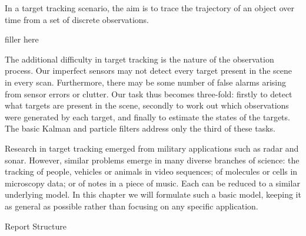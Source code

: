 In a target tracking scenario, the aim is to trace the trajectory of an object over time from a set of discrete observations.

filler here

The additional difficulty in target tracking is the nature of the observation process. Our imperfect sensors may not detect every target present in the scene in every scan. Furthermore, there may be some number of false alarms arising from sensor errors or clutter. Our task thus becomes three-fold: firstly to detect what targets are present in the scene, secondly to work out which observations were generated by each target, and finally to estimate the states of the targets. The basic Kalman and particle filters address only the third of these tasks.

Research in target tracking emerged from military applications such as radar and sonar. However, similar problems emerge in many diverse branches of science: the tracking of people, vehicles or animals in video sequences; of molecules or cells in microscopy data; or of notes in a piece of music. Each can be reduced to a similar underlying model. In this chapter we will formulate such a basic model, keeping it as general as possible rather than focusing on any specific application.

Report Structure